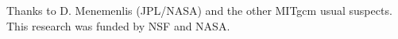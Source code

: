 \documentclass[grl]{agutex2015}
\begin{document}
\begin{article}
%
%
%
%
%
%
%

\begin{acknowledgments}
Thanks to D. Menemenlis (JPL/NASA) and the other MITgcm usual suspects.
This research was funded by NSF and NASA.
\end{acknowledgments}

%
%
%
%
%
%
%
%
%


\end{article}
\end{document}
